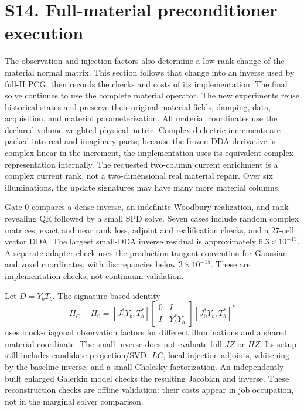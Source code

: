 \clearpage
\section*{S14. Full-material preconditioner execution}
The observation and injection factors also determine a low-rank change of the material normal matrix. This section follows that change into an inverse used by full-H PCG, then records the checks and costs of its implementation. The final solve continues to use the complete material operator.
The new experiments reuse historical states and preserve their original material fields, damping, data, acquisition, and material parameterization. All material coordinates use the declared volume-weighted physical metric. Complex dielectric increments are packed into real and imaginary parts; because the frozen DDA derivative is complex-linear in the increment, the implementation uses its equivalent complex representation internally. The requested two-column current enrichment is a complex current rank, not a two-dimensional real material repair. Over six illuminations, the update signatures may have many more material columns.

Gate 0 compares a dense inverse, an indefinite Woodbury realization, and rank-revealing QR followed by a small SPD solve. Seven cases include random complex matrices, exact and near rank loss, adjoint and realification checks, and a 27-cell vector DDA. The largest small-DDA inverse residual is approximately \(6.3\times10^{-13}\). A separate adapter check uses the production tangent convention for Gaussian and voxel coordinates, with discrepancies below \(3\times10^{-15}\). These are implementation checks, not continuum validation.

Let \(D=Y_bT_b\). The signature-based identity
\[
H_C-H_0=[J_0^*Y_b,T_b^*]
\begin{bmatrix}0&I\\I&Y_b^*Y_b\end{bmatrix}
[J_0^*Y_b,T_b^*]^*
\]
uses block-diagonal observation factors for different illuminations and a shared material coordinate. The small inverse does not evaluate full \(JZ\) or \(HZ\). Its setup still includes candidate projection/SVD, \(LC\), local injection adjoints, whitening by the baseline inverse, and a small Cholesky factorization. An independently built enlarged Galerkin model checks the resulting Jacobian and inverse. These reconstruction checks are offline validation: their costs appear in job occupation, not in the marginal solver comparison.

